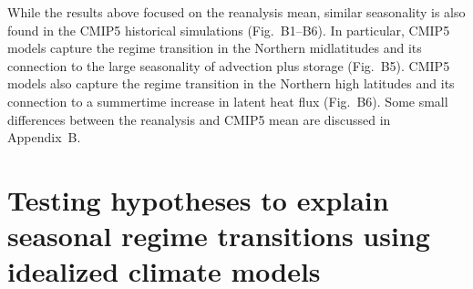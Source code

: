 \documentclass{ametsocV5}
\begin{document}
    While the results above focused on the reanalysis mean, similar seasonality is also found in the CMIP5 historical simulations (Fig.~B1--B6). In particular, CMIP5 models capture the regime transition in the Northern midlatitudes and its connection to the large seasonality of advection plus storage (Fig.~B5). CMIP5 models also capture the regime transition in the Northern high latitudes and its connection to a summertime increase in latent heat flux (Fig.~B6). Some small differences between the reanalysis and CMIP5 mean are discussed in Appendix~B.

\section{Testing hypotheses to explain seasonal regime transitions using idealized climate models} \label{sec:hypo}
\end{document}
